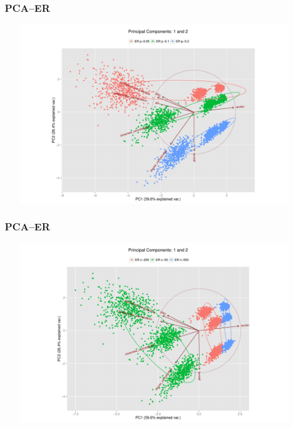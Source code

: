 \documentclass[xcolor={table}]{beamer}
\newenvironment{changemargin}[2]{%
  \begin{list}{}{%
    \setlength{\topsep}{0pt}%
    \setlength{\leftmargin}{#1}%
    \setlength{\rightmargin}{#2}%
    \setlength{\listparindent}{\parindent}%
    \setlength{\itemindent}{\parindent}%
    \setlength{\parsep}{\parskip}%
  }%
  \item[]}{\end{list}}
\begin{document}
\begin{frame}\frametitle{PCA--ER}
	\begin{changemargin}{-2cm}{ -2cm}
		\centering
		\par
		\includegraphics[width=15cm, height=8cm]{images/ER_Param_PCA_Components1_2.pdf}
	\end{changemargin}
\end{frame}

\begin{frame}\frametitle{PCA--ER}
	\begin{changemargin}{-2cm}{ -2cm}
		\centering
		\par
		\includegraphics[width=15cm, height=8cm]{images/ER_Size_PCA_Components1_2.pdf}
	\end{changemargin}
\end{frame}
\end{document}
